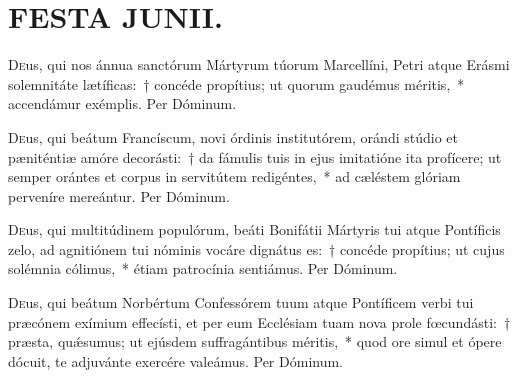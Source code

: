 \documentclass[vesperale_romanum.tex]{subfiles}
\begin{document}
\section[Festa Junii.]{FESTA JUNII.}


\oratio

\lettrine{D}{e}us, qui nos ánnua sanctórum Mártyrum túorum Marcellíni, Petri atque Erásmi solemnitáte lætíficas:~† concéde propítius; ut quorum gaudémus méritis,~* accendámur exémplis. Per Dóminum.

\myrule


\duplex

\oratio

\lettrine{D}{e}us, qui beátum Francíscum, novi órdinis institutórem, orándi stúdio et pæniténtiæ amóre decorásti:~† da fámulis tuis in ejus imitatióne ita profícere; ut semper orántes et corpus in servitútem redigéntes,~* ad cæléstem glóriam perveníre mereántur. Per Dóminum.

\capitdeseq

\myrule



\duplex

\oratio

\lettrine{D}{e}us, qui multitúdinem populórum, beáti Bonifátii Mártyris tui atque Pontíficis zelo, ad agnitiónem tui nóminis vocáre dignátus es:~† concéde propítius; ut cujus solémnia cólimus,~* étiam patrocínia sentiámus.
Per Dóminum.

\hicvir

\capitdeseq

\myrule

\newpage


\duplex

\oratio

\lettrine{D}{e}us, qui beátum Norbértum Confessórem tuum atque Pontíficem verbi tui præcónem exímium effecísti, et per eum Ecclésiam tuam nova prole fœcundásti:~† præsta, quǽsumus; ut ejúsdem suffragántibus méritis,~* quod ore simul et ópere dócuit, te adjuvánte exercére valeámus. Per Dóminum.
\end{document}

